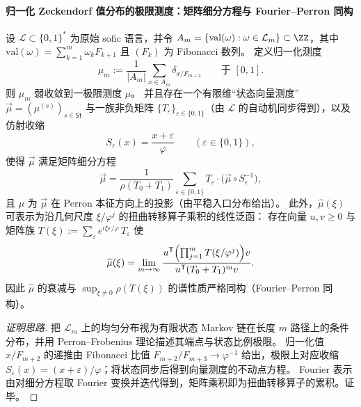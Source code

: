 \paragraph{归一化 Zeckendorf 值分布的极限测度：矩阵细分方程与 Fourier--Perron 同构}
\begin{theorem}\label{thm:gm-zeck-normalized-limit-measure}
设 \(\mathcal{L}\subset\{0,1\}^\ast\) 为原始 sofic 语言，并令 \(A_m=\{\mathrm{val}(\omega):\omega\in\mathcal{L}_m\}\subset\ZZ\)，其中
\(
\mathrm{val}(\omega)=\sum_{k=1}^{m}\omega_k F_{k+1}
\)
且 \((F_k)\) 为 Fibonacci 数列。
定义归一化测度
\[
\mu_m:=\frac{1}{|A_m|}\sum_{x\in A_m}\delta_{x/F_{m+2}}
\qquad\text{于 }[0,1].
\]
则 \(\mu_m\) 弱收敛到一极限测度 \(\mu\)。
并且存在一个有限维“状态向量测度” \(\vec\mu=(\mu^{(s)})_{s\in\mathsf{St}}\) 与一族非负矩阵 \(\{T_\varepsilon\}_{\varepsilon\in\{0,1\}}\)（由 \(\mathcal{L}\) 的自动机同步得到），以及仿射收缩
\[
S_\varepsilon(x)=\frac{x+\varepsilon}{\varphi}
\qquad(\varepsilon\in\{0,1\}),
\]
使得 \(\vec\mu\) 满足矩阵细分方程
\[
\vec\mu
=\frac{1}{\rho(T_0+T_1)}\sum_{\varepsilon\in\{0,1\}}T_\varepsilon\cdot \bigl(\vec\mu\circ S_\varepsilon^{-1}\bigr),
\]
且 \(\mu\) 为 \(\vec\mu\) 在 Perron 本征方向上的投影（由平稳入口分布给出）。
此外，\(\widehat\mu(\xi)\) 可表示为沿几何尺度 \(\xi/\varphi^j\) 的扭曲转移算子乘积的线性泛函：
存在向量 \(u,v\ge 0\) 与矩阵族
\(
T(\xi):=\sum_{\varepsilon}e^{i\xi\varepsilon/\varphi}\,T_\varepsilon
\)
使
\[
\widehat\mu(\xi)=\lim_{m\to\infty}\frac{u^{\mathsf T}\Bigl(\prod_{j=1}^{m}T(\xi/\varphi^{j})\Bigr)v}{u^{\mathsf T}(T_0+T_1)^{m}v}.
\]
因此 \(\widehat\mu\) 的衰减与 \(\sup_{\xi\ne 0}\rho(T(\xi))\) 的谱性质严格同构（Fourier--Perron 同构）。
\end{theorem}


\begin{proof}[证明思路]
把 \(\mathcal{L}_m\) 上的均匀分布视为有限状态 Markov 链在长度 \(m\) 路径上的条件分布，并用 Perron--Frobenius 理论描述其端点与状态比例极限。
归一化值 \(x/F_{m+2}\) 的递推由 Fibonacci 比值 \(F_{m+2}/F_{m+3}\to \varphi^{-1}\) 给出，极限上对应收缩 \(S_\varepsilon(x)=(x+\varepsilon)/\varphi\)；将状态同步后得到向量测度的不动点方程。
Fourier 表示由对细分方程取 Fourier 变换并迭代得到，矩阵乘积即为扭曲转移算子的累积。证毕。
\end{proof}

